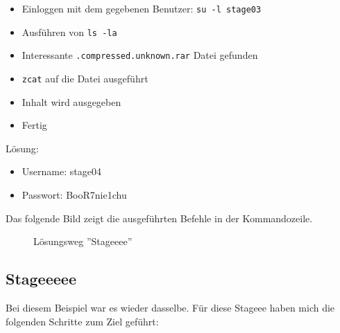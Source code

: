 \documentclass[12pt,a4paper,titlepage,oneside]{scrartcl}
\begin{document}
\begin{itemize}
  \item Einloggen mit dem gegebenen Benutzer: \lstinline{su -l stage03} 
  \item Ausführen von \lstinline{ls -la}
  \item Interessante \lstinline{.compressed.unknown.rar} Datei gefunden
  \item \lstinline{zcat} auf die Datei ausgeführt 
  \item Inhalt wird ausgegeben
  \item Fertig  
\end{itemize}
  
Lösung:
\begin{itemize} 
  \item Username: stage04
  \item Passwort: BooR7nie1chu
\end{itemize}

Das folgende Bild zeigt die ausgeführten Befehle in der Kommandozeile.
  \begin{figure}[h!]
    \centering
    \caption{Lösungsweg ''Stageeee''}
    \label{fig:stageeee_solution}
  \end{figure}


\subsection{Stageeeee}
Bei diesem Beispiel war es wieder dasselbe. Für diese Stageee haben mich die folgenden Schritte zum Ziel geführt:
\end{document}
